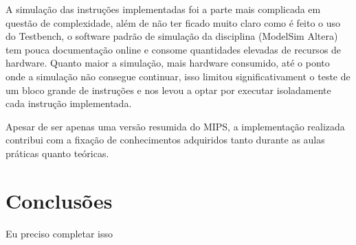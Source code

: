 \documentclass{article}
\begin{document}
    A simulação das instruções implementadas foi a parte mais complicada em questão de complexidade, além
    de não ter ficado muito claro como é feito o uso do Testbench, o software padrão de simulação da
    disciplina (ModelSim Altera) tem pouca documentação online e consome quantidades elevadas de recursos
    de hardware. Quanto maior a simulação, mais hardware consumido, até o ponto onde a simulação não consegue
    continuar, isso limitou significativament o teste de um bloco grande de instruções e nos levou a optar
    por executar isoladamente cada instrução implementada.

    Apesar de ser apenas uma versão resumida do MIPS, a implementação realizada contribui com a fixação
    de conhecimentos adquiridos tanto durante as aulas práticas quanto teóricas.

    \section{Conclusões}

    Eu preciso completar isso
\end{document}
